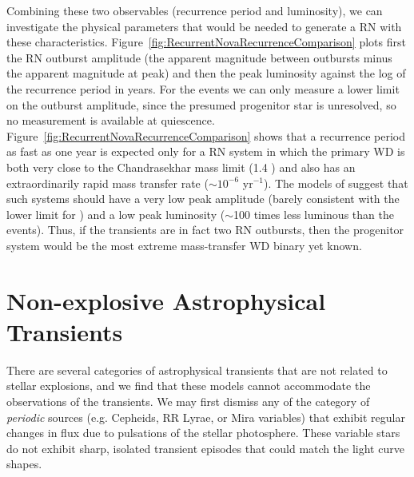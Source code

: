 Combining these two observables (recurrence period and luminosity), we
can investigate the physical parameters that would be needed to
generate a RN with these characteristics. 
Figure~\ref{fig:RecurrentNovaRecurrenceComparison} plots first the RN
outburst amplitude (the apparent magnitude between outbursts minus the
apparent magnitude at peak) and then the peak luminosity against the
log of the recurrence period in years.
For the \spock events we can only measure a lower limit on the
outburst amplitude, since the presumed progenitor star is unresolved,
so no measurement is available at
quiescence. Figure~\ref{fig:RecurrentNovaRecurrenceComparison} shows
that a recurrence period as fast as one year is expected only for a RN
system in which the primary WD is both very close to the Chandrasekhar
mass limit (1.4 \Msun) and also has an extraordinarily rapid mass
transfer rate ($\sim10^{-6}$ \Msun yr$^{-1}$).  The models of
\citet{Yaron:2005} suggest that such systems should have a very low
peak amplitude (barely consistent with the lower limit for \spock) and
a low peak luminosity ($\sim$100 times less luminous than the \spock
events).  Thus, if the \spock transients are in fact two RN outbursts,
then the progenitor system would be the most extreme mass-transfer WD
binary yet known.


\section{Non-explosive Astrophysical Transients}

There are several categories of astrophysical transients that are not
related to stellar explosions, and we find that these models cannot
accommodate the observations of the \spock transients.  We may first
dismiss any of the category of {\it periodic} sources (e.g. Cepheids,
RR Lyrae, or Mira variables) that exhibit regular changes in flux due
to pulsations of the stellar photosphere. These variable stars do not
exhibit sharp, isolated transient episodes that could match the \spock
light curve shapes.

